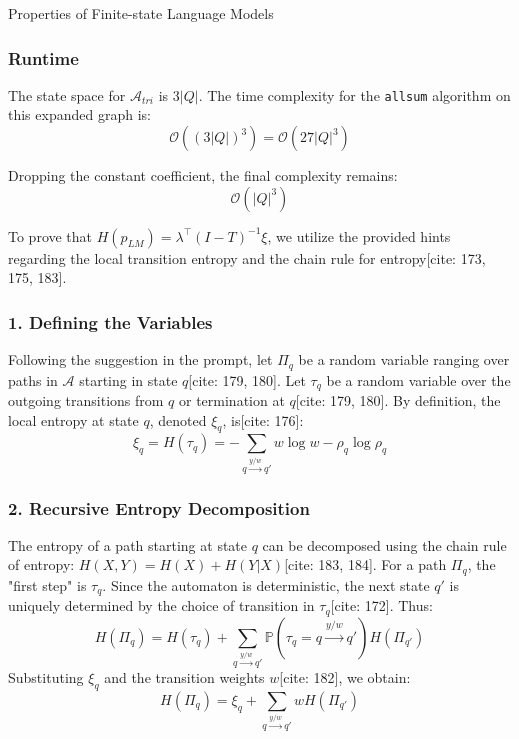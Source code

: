 \begin{question}{Properties of Finite-state Language Models}
\begin{subquestion}
\subsubsection*{Runtime}

The state space for $\mathcal{A}_{tri}$ is $3|Q|$. The time complexity for the \texttt{allsum} algorithm on this expanded graph is:
$$\mathcal{O}((3|Q|)^3) = \mathcal{O}(27|Q|^3)$$

Dropping the constant coefficient, the final complexity remains:
$$\mathcal{O}(|Q|^3)$$

\end{subquestion}

\begin{subquestion}

To prove that $H(p_{LM}) = \lambda^{\top}(I - T)^{-1}\xi$, we utilize the provided hints regarding the local transition entropy and the chain rule for entropy[cite: 173, 175, 183].

\subsubsection*{1. Defining the Variables}
Following the suggestion in the prompt, let $\Pi_q$ be a random variable ranging over paths in $\mathcal{A}$ starting in state $q$[cite: 179, 180]. Let $\tau_q$ be a random variable over the outgoing transitions from $q$ or termination at $q$[cite: 179, 180]. 
By definition, the local entropy at state $q$, denoted $\xi_q$, is[cite: 176]:
\begin{equation}
    \xi_q = H(\tau_q) = -\sum_{q \xrightarrow{y/w} q'} w \log w - \rho_q \log \rho_q
\end{equation}

\subsubsection*{2. Recursive Entropy Decomposition}
The entropy of a path starting at state $q$ can be decomposed using the chain rule of entropy: $H(X, Y) = H(X) + H(Y|X)$[cite: 183, 184]. For a path $\Pi_q$, the "first step" is $\tau_q$. Since the automaton is deterministic, the next state $q'$ is uniquely determined by the choice of transition in $\tau_q$[cite: 172]. Thus:
\begin{equation}
    H(\Pi_q) = H(\tau_q) + \sum_{q \xrightarrow{y/w} q'} \mathbb{P}(\tau_q = q \xrightarrow{y/w} q') H(\Pi_{q'})
\end{equation}
Substituting $\xi_q$ and the transition weights $w$[cite: 182], we obtain:
\begin{equation}
    H(\Pi_q) = \xi_q + \sum_{q \xrightarrow{y/w} q'} w H(\Pi_{q'})
\end{equation}


\end{subquestion}
\end{question}
